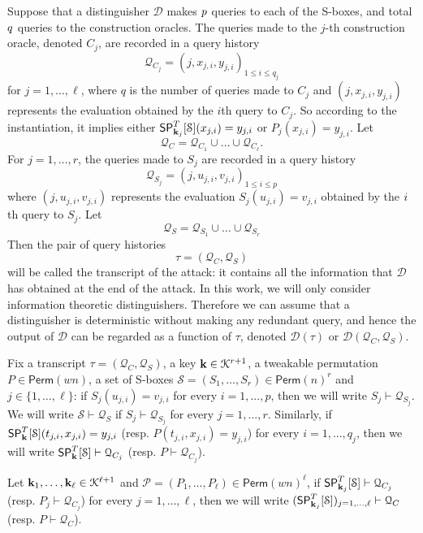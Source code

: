 {}
%
Suppose that a distinguisher $\mathcal{D}$ makes $\mathnormal{p}$ queries to each of the S-boxes, and total $\mathnormal{q}$ queries to the construction oracles. The queries made to the $j$-th construction oracle, denoted $C_j$, are recorded in a query history
%
$$
\mathcal{Q}_{C_j} = (j,x_{j,i},y_{j,i})_{1 \leq i \leq q_j}
$$
%
for $j=1,...,\ell$, where $q$ is the number of queries made to $C_j$ and $(j,x_{j,i},y_{j,i})$ represents the evaluation obtained by the $i$th query to $C_j$. So according to the instantiation, it implies either $\mathsf{SP}_{\mathbf{k}_j}^T[\mathcal{S}](x_{j,i}) = y_{j,i}$  or ${P}_j(x_{j,i}) = y_{j,i}$. Let
%
$$\mathcal{Q}_{C}=\mathcal{Q}_{C_1}\cup\ldots\cup\mathcal{Q}_{C_\ell}.$$
%
For $j = 1,\ldots,r$, the queries made to $S_j$ are recorded in a query history
%
$$
\mathcal{Q}_{S_j} = (j, u_{j,i}, v_{j,i})_{1 \leq i \leq p}
$$
%
where $(j, u_{j,i}, v_{j,i})$  represents the evaluation $S_j(u_{j,i}) = v_{j,i}$ obtained by the $\mathnormal{i}$th query to $S_j$. Let
%
$$
\mathcal{Q}_{S}=\mathcal{Q}_{S_1} \cup \ldots \cup \mathcal{Q}_{S_r}
$$
%
Then the pair of query histories
%
$$
\tau = (\mathcal{Q}_{C}, \mathcal{Q}_{S})
$$
%
will be called the transcript of the attack: it contains all the information that $\mathcal{D}$ has obtained at the end of the attack. In this work, we will only consider
information theoretic distinguishers. Therefore we can assume that a distinguisher is deterministic without making any redundant query, and hence the output of  $\mathcal{D}$  can be regarded as a function of $\tau$, denoted $\mathcal{D}(\tau)$ or $\mathcal{D}(\mathcal{Q}_C, \mathcal{Q}_S)$.





Fix a transcript $\tau = (\mathcal{Q}_C,\mathcal{Q}_S)$, a key $\mathbf{k} \in \mathcal{K}^{r+1}$, a tweakable permutation ${P} \in {\mathsf{Perm}}(wn)$,  a set of S-boxes $\mathcal{S}=(S_1, \ldots  ,S_r) \in \mathsf{Perm}(n)^r $ and $j \in \{1, \ldots, \ell \}$: if $S_j(u_{j,i})=v_{j,i}$ for every $i = 1, . . . , p$, then we will write $S_j\vdash\mathcal{Q}_{S_j}$. We will write $\mathcal{S}\vdash\mathcal{Q}_S$ if $S_j\vdash\mathcal{Q}_{S_j}$ for every $j = 1, . . . , r$. Similarly, if
$\mathsf{SP}_{\mathbf{k}}^T[\mathcal{S}](t_{j,i}, x_{j,i}) = y_{j,i}$ (resp. ${P}(t_{j,i}, x_{j,i}) = y_{j,i}$) for every $i = 1, . . . , q_j$, then we will write $\mathsf{SP}_{\mathbf{k}}^T[\mathcal{S}]\vdash\mathcal{Q}_{C_j}$ (resp. ${P}\vdash\mathcal{Q}_{C_j}$).


Let $\mathbf{k}_1, \ldots ,\mathbf{k}_{\ell} \in \mathcal{K}^{\ell+1}$ and ${\mathcal{P}} = ({P}_1, \ldots ,{P}_\ell) \in {\mathsf{Perm}}(wn)^\ell$, if $\mathsf{SP}_{\mathbf{k}_j}^T[\mathcal{S}]\vdash\mathcal{Q}_{C_j}$ (resp. ${P}_j\vdash\mathcal{Q}_{C_j}$) for every $j = 1, \ldots ,\ell$, then we will write $(\mathsf{SP}_{\mathbf{k}_j}^{T}[\mathcal{S}])_{j = 1, \ldots ,\ell} \vdash \mathcal{Q}_C$ (resp. ${P}\vdash\mathcal{Q}_{C}$).


